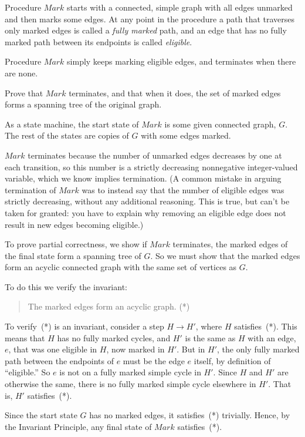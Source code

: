
\begin{problem}
Procedure $Mark$ starts with a connected, simple graph with all edges
unmarked and then marks some edges.  At any point in the procedure a path
that traverses only marked edges is called a \emph{fully marked} path, and
an edge that has no fully marked path between its endpoints is called
\emph{eligible}.

Procedure $Mark$ simply keeps marking eligible edges, and terminates when
there are none.

Prove that $Mark$ terminates, and that when it does, the set of marked
edges forms a spanning tree of the original graph.

\begin{solution}As a state machine, the start state of $Mark$ is some given
connected graph, $G$.  The rest of the states are copies of $G$ with some
edges marked.

$Mark$ terminates because the number of unmarked edges decreases by one at
each transition, so this number is a strictly decreasing nonnegative
integer-valued variable, which we know implies termination.  (A common
mistake in arguing termination of $Mark$ was to instead say that the number
of eligible edges was strictly decreasing, without any additional
reasoning.  This is true, but can't be taken for granted: you have to
explain why removing an eligible edge does not result in new edges becoming
eligible.)

To prove partial correctness, we show if $Mark$ terminates, the marked
edges of the final state form a spanning tree of $G$.  So we must show
that the marked edges form an acyclic connected graph with the same set of
vertices as $G$.

To do this we verify the invariant:
\begin{quote}
The marked edges form an acyclic graph.  (*)
\end{quote}

To verify~(*) is an invariant, consider a step $H\to H'$, where $H$
satisfies~(*).  This means that $H$ has no fully marked cycles, and $H'$
is the same as $H$ with an edge, $e$, that was one eligible in $H$, now
marked in $H'$.  But in $H'$, the only fully marked path between the
endpoints of $e$ must be the edge $e$ itself, by definition of
``eligible.''  So $e$ is not on a fully marked simple cycle in $H'$.
Since $H$ and $H'$ are otherwise the same, there is no fully marked simple
cycle elsewhere in $H'$.  That is, $H'$ satisfies~(*).

Since the start state $G$ has no marked edges, it satisfies~(*) trivially.
Hence, by the Invariant Principle, any final state of $Mark$
satisfies~(*).


\end{solution}
\end{problem}
